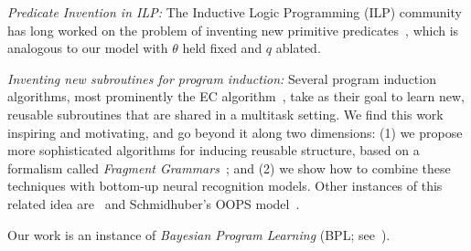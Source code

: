 \documentclass{article}
\begin{document}
 \noindent \emph{Predicate Invention in ILP:} The Inductive Logic Programming (ILP) community
 has long worked on the problem of inventing new primitive predicates~\cite{DBLP:conf/ecai/LinDETM14,muggleton2015meta}, which is analogous to our model with $\theta$ held fixed and $q$ ablated.

 \noindent \emph{Inventing new subroutines for program induction:}
 Several program induction algorithms, most prominently the EC algorithm~\cite{Dechter:2013:BLV:2540128.2540316}, take as their goal to learn new, reusable subroutines that are shared in a multitask setting. We find this work inspiring and motivating,
 and go beyond it along two dimensions: (1) we propose more sophisticated algorithms for
 inducing reusable structure, based on a formalism called \emph{Fragment Grammars}~\cite{tim};
 and (2) we show how to combine these techniques with bottom-up neural recognition models.
 Other instances of this related idea are~\cite{DBLP:conf/icml/LiangJK10} and Schmidhuber's OOPS model~\cite{schmidhuber2004optimal}.
 
 
 

 






Our work is an instance of
 \emph{Bayesian Program
  Learning} (BPL; see~\citep{lake2013one,Dechter:2013:BLV:2540128.2540316,ellis2016sampling,DBLP:conf/icml/LiangJK10}).


\end{document}
